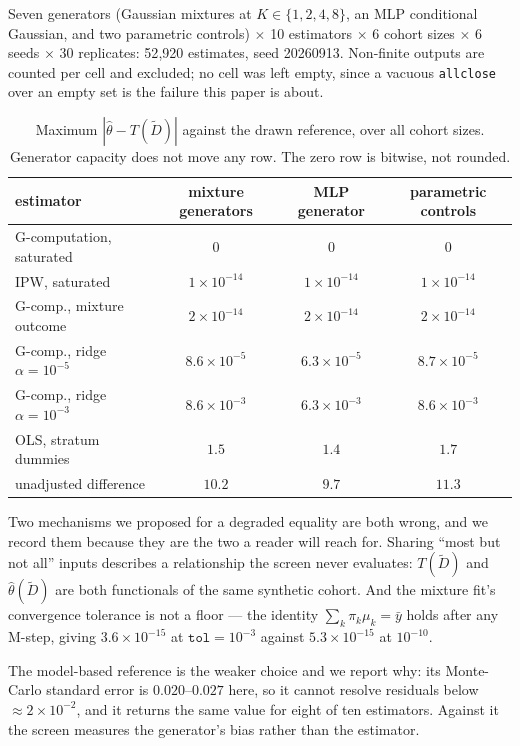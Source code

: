 Seven generators (Gaussian mixtures at $K \in \{1,2,4,8\}$, an MLP conditional
Gaussian, and two parametric controls) $\times$ 10 estimators $\times$ 6 cohort
sizes $\times$ 6 seeds $\times$ 30 replicates: 52{,}920 estimates, seed
20260913. Non-finite outputs are counted per cell and excluded; no cell was left
empty, since a vacuous \texttt{allclose} over an empty set is the failure this
paper is about.

\begin{table}[htbp]
\small
\centering
\caption{Maximum $|\hat\theta - T(\tilde D)|$ against the drawn reference, over
all cohort sizes. Generator capacity does not move any row. The zero row is
bitwise, not rounded.}
\label{tab:learned}
\begin{tabular}{@{}lccc@{}}
\toprule
estimator & mixture generators & MLP generator & parametric controls \\
\midrule
G-computation, saturated        & $0$        & $0$        & $0$ \\
IPW, saturated                  & $1\!\times\!10^{-14}$ & $1\!\times\!10^{-14}$ & $1\!\times\!10^{-14}$ \\
G-comp., mixture outcome        & $2\!\times\!10^{-14}$ & $2\!\times\!10^{-14}$ & $2\!\times\!10^{-14}$ \\
G-comp., ridge $\alpha=10^{-5}$ & $8.6\!\times\!10^{-5}$ & $6.3\!\times\!10^{-5}$ & $8.7\!\times\!10^{-5}$ \\
G-comp., ridge $\alpha=10^{-3}$ & $8.6\!\times\!10^{-3}$ & $6.3\!\times\!10^{-3}$ & $8.6\!\times\!10^{-3}$ \\
OLS, stratum dummies            & $1.5$      & $1.4$      & $1.7$ \\
unadjusted difference           & $10.2$     & $9.7$      & $11.3$ \\
\bottomrule
\end{tabular}
\end{table}

Two mechanisms we proposed for a degraded equality are both wrong, and we record
them because they are the two a reader will reach for. Sharing ``most but not
all'' inputs describes a relationship the screen never evaluates: $T(\tilde D)$
and $\hat\theta(\tilde D)$ are both functionals of the same synthetic cohort.
And the mixture fit's convergence tolerance is not a floor --- the identity
$\sum_k \pi_k \mu_k = \bar y$ holds after any M-step, giving
$3.6\times10^{-15}$ at $\texttt{tol}=10^{-3}$ against $5.3\times10^{-15}$ at
$10^{-10}$.

The model-based reference is the weaker choice and we report why: its
Monte-Carlo standard error is $0.020$--$0.027$ here, so it cannot resolve
residuals below $\approx 2\times10^{-2}$, and it returns the same value for
eight of ten estimators. Against it the screen measures the generator's bias
rather than the estimator.

